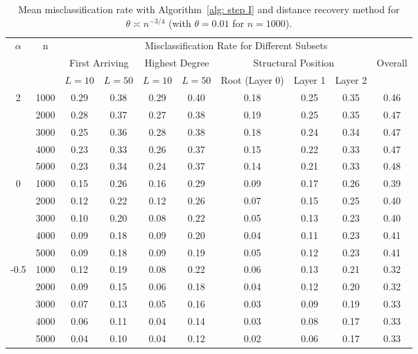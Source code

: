 \documentclass[twoside,11pt]{article}
\theoremstyle{remark}
\begin{document}
\begin{table}[tbp]
\setlength{\tabcolsep}{3.5pt}

\centering

{
\begin{tabular}{c|c|cc|cc|ccc|c}
\hline
\hline
\multirow{3}{*}{$\alpha$} & \multirow{3}{*}{n}
& \multicolumn{8}{c}{Misclassification Rate for Different Subsets} \\
\cline{3-10}
& 
& \multicolumn{2}{c|}{First Arriving}
& \multicolumn{2}{c|}{Highest Degree}
& \multicolumn{3}{c|}{Structural Position}
& \multirow{2}{*}{Overall} \\
\cline{3-9}
& 
& $L=10$ & $L=50$
& $L=10$ & $L=50$
& Root (Layer 0) & Layer 1 & Layer 2
& \\
\hline
\multirow{5}{*}{2}
& 1000 & 0.29 & 0.38 & 0.29 & 0.40 & 0.18 & 0.25 & 0.35 & 0.46 \\
& 2000 & 0.28 & 0.37 & 0.27 & 0.38 & 0.19 & 0.25 & 0.35 & 0.47 \\
& 3000 & 0.25 & 0.36 & 0.28 & 0.38 & 0.18 & 0.24 & 0.34 & 0.47 \\
& 4000 & 0.23 & 0.33 & 0.26 & 0.37 & 0.15 & 0.22 & 0.33 & 0.47 \\
& 5000 & 0.23 & 0.34 & 0.24 & 0.37 & 0.14 & 0.21 & 0.33 & 0.48 \\
\hline
\multirow{5}{*}{0}
& 1000 & 0.15 & 0.26 & 0.16 & 0.29 & 0.09 & 0.17 & 0.26 & 0.39 \\
& 2000 & 0.12 & 0.22 & 0.12 & 0.26 & 0.07 & 0.15 & 0.25 & 0.40 \\
& 3000 & 0.10 & 0.20 & 0.08 & 0.22 & 0.05 & 0.13 & 0.23 & 0.40 \\
& 4000 & 0.09 & 0.18 & 0.09 & 0.20 & 0.04 & 0.11 & 0.23 & 0.41 \\
& 5000 & 0.09 & 0.18 & 0.09 & 0.19 & 0.05 & 0.12 & 0.23 & 0.41 \\
\hline
\multirow{5}{*}{-0.5}
& 1000 & 0.12 & 0.19 & 0.08 & 0.22 & 0.06 & 0.13 & 0.21 & 0.32 \\
& 2000 & 0.09 & 0.15 & 0.06 & 0.18 & 0.04 & 0.12 & 0.20 & 0.32 \\
& 3000 & 0.07 & 0.13 & 0.05 & 0.16 & 0.03 & 0.09 & 0.19 & 0.33 \\
& 4000 & 0.06 & 0.11 & 0.04 & 0.14 & 0.03 & 0.08 & 0.17 & 0.33 \\
& 5000 & 0.04 & 0.10 & 0.04 & 0.12 & 0.02 & 0.06 & 0.17 & 0.33 \\
\hline
\hline
\end{tabular}
}


\caption{Mean misclassification rate with Algorithm~\ref{alg: step I} and distance recovery method for $\theta \asymp n^{-3/4}$ (with $\theta=0.01$ for $n=1000$).}
\label{tab:mean_error_scale_n34}
\end{table}
\end{document}
